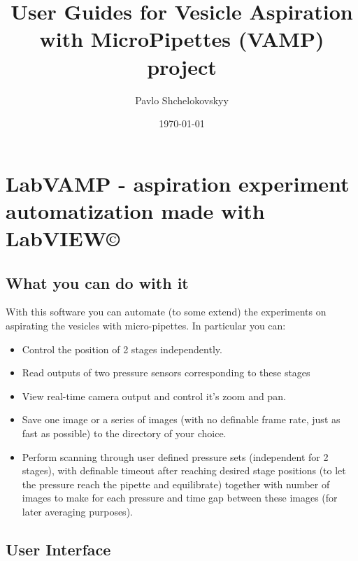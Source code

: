 \documentclass[a4paper,12pt]{article}
\begin{document}
\title{User Guides for Vesicle Aspiration with MicroPipettes (VAMP) project}
\author{Pavlo Shchelokovskyy}
\date{\today}
\maketitle


\section{LabVAMP - aspiration experiment automatization made with LabVIEW\copyright{}}\label{labvamp}

\subsection{What you can do with it}\label{labvamp-features}

With this software you can automate (to some extend) the experiments on aspirating the vesicles with micro-pipettes. In particular you can:
\begin{itemize}
	\item Control the position of 2 stages independently.
	\item Read outputs of two pressure sensors corresponding to these stages
	\item View real-time camera output and control it's zoom and pan.
	\item Save one image or a series of images (with no definable frame rate, just as fast as possible) to the directory of your choice.
	\item Perform scanning through user defined pressure sets (independent for 2 stages), with definable timeout after reaching desired stage positions (to let the pressure reach the pipette and equilibrate) together with number of images to make for each pressure and time gap between these images (for later averaging purposes).
\end{itemize}

\subsection{User Interface}\label{labvamp-ui}
\end{document}
